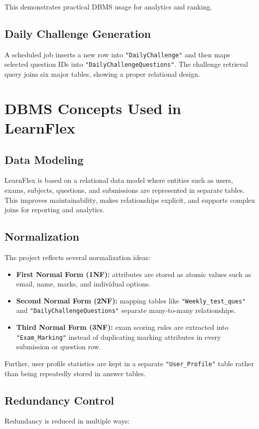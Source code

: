 \documentclass[12pt,a4paper]{article}
\begin{document}
This demonstrates practical DBMS usage for analytics and ranking.

\subsection{Daily Challenge Generation}
A scheduled job inserts a new row into \texttt{"DailyChallenge"} and then maps selected question IDs into \texttt{"DailyChallengeQuestions"}. The challenge retrieval query joins six major tables, showing a proper relational design.

\section{DBMS Concepts Used in LearnFlex}
\subsection{Data Modeling}
LearnFlex is based on a relational data model where entities such as users, exams, subjects, questions, and submissions are represented in separate tables. This improves maintainability, makes relationships explicit, and supports complex joins for reporting and analytics.

\subsection{Normalization}
The project reflects several normalization ideas:

\begin{itemize}[leftmargin=1.5em]
  \item \textbf{First Normal Form (1NF):} attributes are stored as atomic values such as email, name, marks, and individual options.
  \item \textbf{Second Normal Form (2NF):} mapping tables like \texttt{"Weekly\_test\_ques"} and \texttt{"DailyChallengeQuestions"} separate many-to-many relationships.
  \item \textbf{Third Normal Form (3NF):} exam scoring rules are extracted into \texttt{"Exam\_Marking"} instead of duplicating marking attributes in every submission or question row.
\end{itemize}

Further, user profile statistics are kept in a separate \texttt{"User\_Profile"} table rather than being repeatedly stored in answer tables.

\subsection{Redundancy Control}
Redundancy is reduced in multiple ways:
\end{document}
